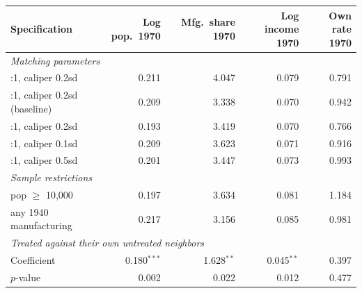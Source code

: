 \begin{tabular}{lrrrr}
\toprule
Specification & Log pop.\ 1970 & Mfg.\ share 1970 & Log income 1970 & Own rate 1970 \\
\midrule
\multicolumn{5}{l}{\emph{Matching parameters}} \\
\quad 1:1, caliper 0.2sd & 0.211 & 4.047 & 0.079 & 0.791 \\
\quad 3:1, caliper 0.2sd (baseline) & 0.209 & 3.338 & 0.070 & 0.942 \\
\quad 5:1, caliper 0.2sd & 0.193 & 3.419 & 0.070 & 0.766 \\
\quad 3:1, caliper 0.1sd & 0.209 & 3.623 & 0.071 & 0.916 \\
\quad 3:1, caliper 0.5sd & 0.201 & 3.447 & 0.073 & 0.993 \\
\multicolumn{5}{l}{\emph{Sample restrictions}} \\
\quad pop $\geq$ 10,000 & 0.197 & 3.634 & 0.081 & 1.184 \\
\quad any 1940 manufacturing & 0.217 & 3.156 & 0.085 & 0.981 \\
\multicolumn{5}{l}{\emph{Treated against their own untreated neighbors}} \\
\quad Coefficient & 0.180$^{***}$ & 1.628$^{**}$ & 0.045$^{**}$ & 0.397 \\
\quad $p$-value & 0.002 & 0.022 & 0.012 & 0.477 \\
\bottomrule
\end{tabular}